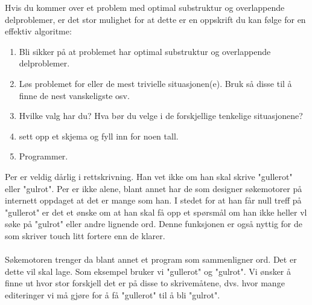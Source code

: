 \noindent Hvis du kommer over et problem med optimal substruktur og overlappende delproblemer, er det stor mulighet for at dette er en oppskrift du kan følge for en effektiv algoritme:
\begin{enumerate}
    \item Bli sikker på at problemet har optimal substruktur og overlappende delproblemer.
    \item Løs problemet for eller de mest trivielle situasjonen(e). Bruk så disse til å finne de nest vanskeligste osv.
    \item Hvilke valg har du? Hva bør du velge i de forskjellige tenkelige situasjonene?
    \item sett opp et skjema og fyll inn for noen tall.
    \item Programmer.
\end{enumerate}

Per er veldig dårlig i rettskrivning. Han vet ikke om han skal skrive "gullerot" eller "gulrot". Per er ikke alene, blant annet har de som designer søkemotorer på internett oppdaget at det er mange som han. I stedet for at han får null treff på "gullerot" er det et ønske om at han skal få opp et spørsmål om han ikke heller vl søke på "gulrot" eller andre lignende ord. Denne funksjonen er også nyttig for de som skriver touch litt fortere enn de klarer.
\\\\
Søkemotoren trenger da blant annet et program som sammenligner ord. Det er dette vil skal lage. Som eksempel bruker vi "gullerot" og "gulrot". Vi ønsker å finne ut hvor stor forskjell det er på disse to skrivemåtene, dvs. hvor mange editeringer vi må gjøre for å få "gullerot" til å bli "gulrot". 

